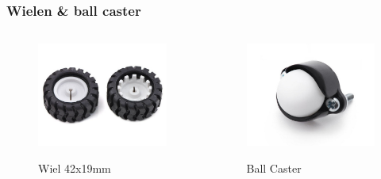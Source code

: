 \documentclass
   [kulak] %
   {kulakbeamer}
\begin{document}
\begin{frame}
	\frametitle{Wielen \& ball caster}
	\begin{columns}
		\begin{figure}
			\centering
			\includegraphics[width=.7\textwidth]{wielen}
			\caption{Wiel 42x19mm}\cite{Wiel42x19mm}
		\end{figure}
		\begin{figure}
			\centering
			\includegraphics[width=.7\textwidth]{ballcaster}
			\caption{Ball Caster}\cite{BallCaster}
		\end{figure}
	\end{columns}
	
\end{frame}
\end{document}
